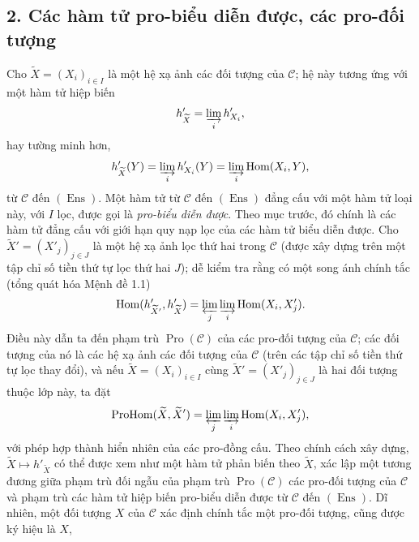 \documentclass[11pt,twoside,openany]{book}
\numberwithin{equation}{section}
\begin{document}
\subsection*{2. Các hàm tử pro-biểu diễn được, các pro-đối tượng}

Cho $\widetilde X=(X_i)_{i\in I}$ là một hệ xạ ảnh các đối tượng của
$\mathcal C$; hệ này tương ứng với một hàm tử hiệp biến
\[
  h'_{\widetilde X}=\varinjlim_i h'_{X_i},
\]
hay tường minh hơn,
\[
  h'_{\widetilde X}(Y)=\varinjlim_i h'_{X_i}(Y)
  =\varinjlim_i\operatorname{Hom}(X_i,Y),
\]
từ $\mathcal C$ đến $(\operatorname{Ens})$. Một hàm tử từ $\mathcal C$ đến
$(\operatorname{Ens})$ đẳng cấu với một hàm tử loại này, với $I$ lọc, được
gọi là \emph{pro-biểu diễn được}. Theo mục trước, đó chính là các hàm tử đẳng
cấu với giới hạn quy nạp lọc của các hàm tử biểu diễn được. Cho
$\widetilde X'=(X'_j)_{j\in J}$ là một hệ xạ ảnh lọc thứ hai trong
$\mathcal C$ (được xây dựng trên một tập chỉ số tiền thứ tự lọc thứ hai
$J$); dễ kiểm tra rằng có một song ánh chính tắc (tổng quát hóa Mệnh đề 1.1)
\[
  \operatorname{Hom}(h'_{\widetilde X'},h'_{\widetilde X})
  =\varprojlim_j\varinjlim_i\operatorname{Hom}(X_i,X'_j).
\]
Điều này dẫn ta đến phạm trù $\operatorname{Pro}(\mathcal C)$ của các
pro-đối tượng của $\mathcal C$; các đối tượng của nó là các hệ xạ ảnh các đối
tượng của $\mathcal C$ (trên các tập chỉ số tiền thứ tự lọc thay đổi), và nếu
$\widetilde X=(X_i)_{i\in I}$ cùng
$\widetilde X'=(X'_j)_{j\in J}$ là hai đối tượng thuộc lớp này, ta đặt
\[
  \operatorname{ProHom}(\widetilde X,\widetilde X')
  =\varprojlim_j\varinjlim_i\operatorname{Hom}(X_i,X'_j),
\]
với phép hợp thành hiển nhiên của các pro-đồng cấu. Theo chính cách xây dựng,
$\widetilde X\longmapsto h'_{\widetilde X}$ có thể được xem như một hàm tử
phản biến theo $\widetilde X$, xác lập một tương đương giữa phạm trù đối ngẫu
của phạm trù $\operatorname{Pro}(\mathcal C)$ các pro-đối tượng của
$\mathcal C$ và phạm trù các hàm tử hiệp biến pro-biểu diễn được từ
$\mathcal C$ đến $(\operatorname{Ens})$. Dĩ nhiên, một đối tượng $X$ của
$\mathcal C$ xác định chính tắc một pro-đối tượng, cũng được ký hiệu là $X$,
\end{document}
